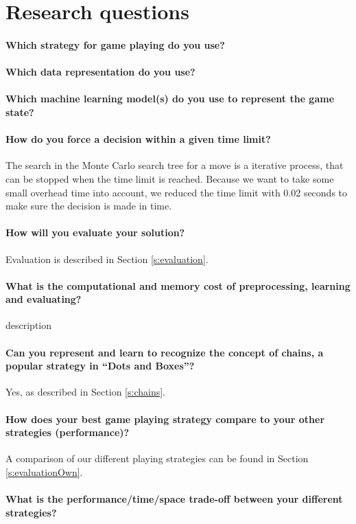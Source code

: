 \section{Research questions}
\paragraph{Which strategy for game playing do you use?} %
	
\paragraph{Which data representation do you use?} %

\paragraph{Which machine learning model(s) do you use to represent the game state?} %
	
\paragraph{How do you force a decision within a given time limit?} The search in the Monte Carlo search tree for a move is a iterative process, that can be stopped when the time limit is reached. Because we want to take some small overhead time into account, we reduced the time limit with 0.02 seconds to make sure the decision is made in time.
	
\paragraph{How will you evaluate your solution?} Evaluation is described in Section \ref{s:evaluation}.
	
\paragraph{What is the computational and memory cost of preprocessing, learning and evaluating?} description
	
\paragraph{Can you represent and learn to recognize the concept of chains, a popular strategy in ``Dots and Boxes''?} Yes, as described in Section \ref{s:chains}.
	
\paragraph{How does your best game playing strategy compare to your other strategies (performance)?} A comparison of our different playing strategies can be found in Section \ref{s:evaluationOwn}.
	
\paragraph{What is the performance/time/space trade-off between your different strategies?} %
